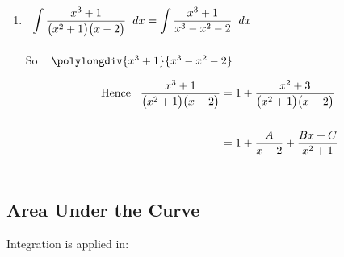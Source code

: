\documentclass[11pt,a4paper]{article}
\begin{document}
\begin{enumerate}
\item $\hspace{0.2cm} \displaystyle{\int \dfrac{x^3 + 1}{\big(x^2 + 1\big)\big(x - 2\big)}\hspace{0.2cm}dx = \int \dfrac{x^3 + 1}{x^3 - x^2 - 2}\hspace{0.2cm}dx}$\\\\



So $\hspace{0.3cm}\polylongdiv{x^3+1}{x^3 - x^2 - 2}$

\begin{align*}
\text{Hence}\hspace{0.3cm} \dfrac{x^3 + 1}{\big(x^2 + 1\big) \big( x - 2\big)} & = 1 + \dfrac{x^2 + 3}{\big(x^2 + 1\big)\big(x - 2\big)}\\\\
& = 1 + \dfrac{A}{x - 2} + \dfrac{Bx + C}{x^2 + 1}\\\\
\end{align*}
\end{enumerate}

















\subsection{Area Under the Curve}

Integration is applied in:
\end{document}
